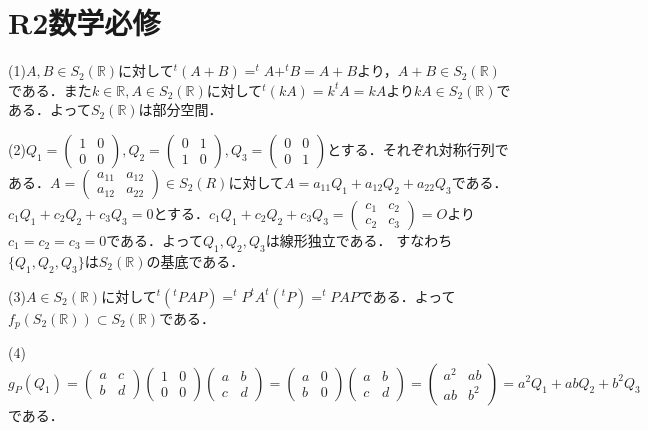 \documentclass[
		book,
		head_space=20mm,
		foot_space=20mm,
		gutter=10mm,
		line_length=190mm
]{jlreq}
\begin{document}
\section{R2数学必修}
(1)$A,B \in S_2(\mathbb{R})$に対して$^t(A+B)=^t\!A+^t\!B=A+B$より，$A+B \in S_2(\mathbb{R})$である．また$k \in \mathbb{R},A \in S_2(\mathbb{R})$に対して$^t(kA)=k^t\!A=kA$より$kA \in S_2(\mathbb{R})$である．よって$S_2(\mathbb{R})$は部分空間．

(2)$Q_1=\begin{pmatrix}
    1 & 0\\
    0 & 0
\end{pmatrix},Q_2=\begin{pmatrix}
    0 & 1\\
    1 & 0
\end{pmatrix},Q_3=\begin{pmatrix}
        0 & 0\\
        0 & 1
\end{pmatrix}$とする．それぞれ対称行列である．$A=\begin{pmatrix}
    a_{11} & a_{12}\\
    a_{12} & a_{22}
\end{pmatrix}\in S_2(R)$に対して$A=a_{11}Q_1+a_{12}Q_2+a_{22}Q_3$である．$c_1Q_1+c_2Q_2+c_3Q_3=0$とする．$c_1Q_1+c_2Q_2+c_3Q_3=\begin{pmatrix}
    c_1 & c_2\\
    c_2 & c_3
\end{pmatrix}=O$より$c_1=c_2=c_3=0$である．よって$Q_1,Q_2,Q_3$は線形独立である．
すなわち$\{ Q_1,Q_2,Q_3 \}$は$S_2(\mathbb{R})$の基底である．

(3)$A \in S_2(\mathbb{R})$に対して$^t(^tPAP)=^tP^tA^t(^tP)=^tPAP$である．よって$f_p(S_2(\mathbb{R}))\subset S_2(\mathbb{R})$である．

(4)$g_P(Q_1)=\begin{pmatrix}
    a & c \\
    b & d
    \end{pmatrix}\begin{pmatrix}
        1 & 0\\
        0 & 0
    \end{pmatrix}\begin{pmatrix}
        a & b\\
        c & d
    \end{pmatrix}=\begin{pmatrix}
        a & 0\\
        b & 0
    \end{pmatrix}\begin{pmatrix}
        a & b\\
        c & d
    \end{pmatrix}=\begin{pmatrix}
        a^2 & ab\\
        ab & b^2
        \end{pmatrix}=a^2Q_1+abQ_2+b^2Q_3$である．
\end{document}

